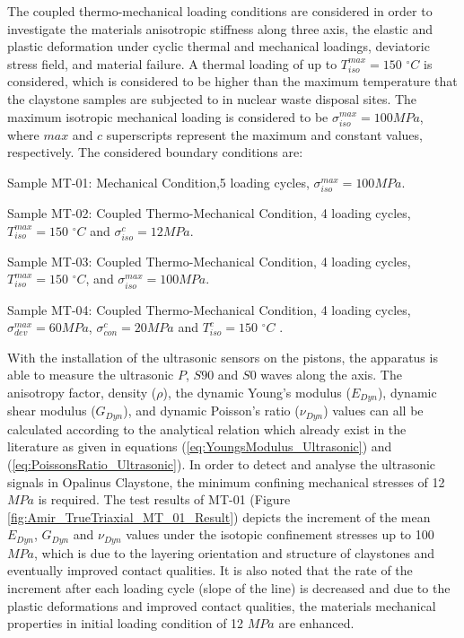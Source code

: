 The coupled thermo-mechanical loading conditions are considered in order to investigate the materials anisotropic stiffness along three axis, the elastic and plastic deformation under cyclic thermal and mechanical loadings, deviatoric stress field, and material failure. A thermal loading of up to $T_{iso}^{max}=150$ $^{\circ}C$ is considered, which is considered to be higher than the maximum temperature that the claystone samples are subjected to in nuclear waste disposal sites. The maximum isotropic mechanical loading is considered to be $\sigma_{iso}^{max}=100 MPa$, where $max$ and $c$ superscripts represent the maximum and constant values, respectively. The considered boundary conditions are:

\begin{list}{-}{\leftmargin=1em \itemindent=0em \itemsep=0.1em}
  \item Sample MT-01: Mechanical Condition,5 loading cycles, $\sigma_{iso}^{max}=100 MPa$.
  \item Sample MT-02: Coupled Thermo-Mechanical Condition, 4 loading cycles, $T_{iso}^{max}=150$ $^{\circ}C$ and $\sigma_{iso}^{c}=12 MPa$.
  \item Sample MT-03: Coupled Thermo-Mechanical Condition, 4 loading cycles, $T_{iso}^{max}=150$ $^{\circ}C$, and $\sigma_{iso}^{max}=100 MPa$.
  \item Sample MT-04: Coupled Thermo-Mechanical Condition, 4 loading cycles, $\sigma_{dev}^{max}=60 MPa$, $\sigma_{con}^{c}= 20 MPa$ and $T_{iso}^{c}=150$ $^{\circ}C$ .
\end{list}

With the installation of the ultrasonic sensors on the pistons, the apparatus is able to measure the ultrasonic $P$, $S90$ and $S0$ waves along the axis. The anisotropy factor, density ($\rho$), the dynamic Young’s modulus ($E_{Dyn}$), dynamic shear modulus ($G_{Dyn}$), and dynamic Poisson’s ratio ($\nu_{Dyn}$) values can all be calculated according to the analytical relation which already exist in the literature \cite{Motraetal2018} as given in equations (\ref{eq:YoungsModulus_Ultrasonic}) and (\ref{eq:PoissonsRatio_Ultrasonic}). In order to detect and analyse the ultrasonic signals in Opalinus Claystone, the minimum confining mechanical stresses of 12 $MPa$ is required. The test results of MT-01 (Figure \ref{fig:Amir_TrueTriaxial_MT_01_Result}) depicts the increment of the mean $E_{Dyn}$, $G_{Dyn}$ and $\nu_{Dyn}$ values under the isotopic confinement stresses up to 100 $MPa$, which is due to the layering orientation and structure of claystones and eventually improved contact qualities. It is also noted that the rate of the increment after each loading cycle (slope of the line) is decreased and due to the plastic deformations and improved contact qualities, the materials mechanical properties in initial loading condition of 12 $MPa$ are enhanced. 

